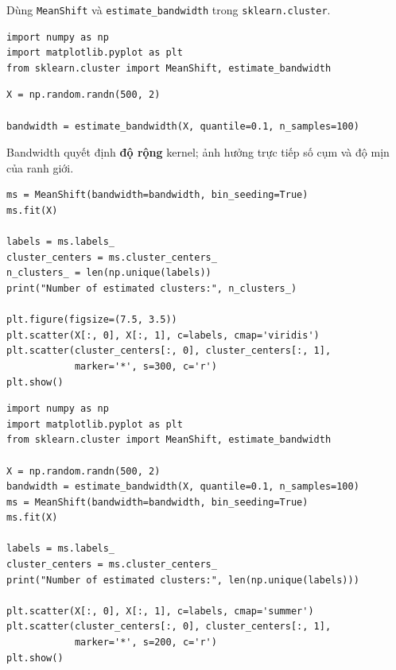 \begin{phuongphap}[title={scikit-learn}]
Dùng \texttt{MeanShift} và \texttt{estimate\_bandwidth} trong \texttt{sklearn.cluster}.
\end{phuongphap}

\begin{vidu}[title={Import}]
\begin{lstlisting}
import numpy as np
import matplotlib.pyplot as plt
from sklearn.cluster import MeanShift, estimate_bandwidth
\end{lstlisting}
\end{vidu}

\begin{vidu}[title={Sinh dữ liệu và ước lượng bandwidth}]
\begin{lstlisting}
X = np.random.randn(500, 2)

bandwidth = estimate_bandwidth(X, quantile=0.1, n_samples=100)
\end{lstlisting}
\end{vidu}

\begin{ynghia}[title={Bandwidth}]
Bandwidth quyết định \textbf{độ rộng} kernel; ảnh hưởng trực tiếp số cụm và độ mịn của ranh giới.
\end{ynghia}

\begin{vidu}[title={Khởi tạo, huấn luyện, trực quan}]
\begin{lstlisting}
ms = MeanShift(bandwidth=bandwidth, bin_seeding=True)
ms.fit(X)

labels = ms.labels_
cluster_centers = ms.cluster_centers_
n_clusters_ = len(np.unique(labels))
print("Number of estimated clusters:", n_clusters_)

plt.figure(figsize=(7.5, 3.5))
plt.scatter(X[:, 0], X[:, 1], c=labels, cmap='viridis')
plt.scatter(cluster_centers[:, 0], cluster_centers[:, 1],
            marker='*', s=300, c='r')
plt.show()
\end{lstlisting}
\end{vidu}

\begin{vidu}[title={Ví dụ đầy đủ (dữ liệu Gaussian 2D)}]
\begin{lstlisting}
import numpy as np
import matplotlib.pyplot as plt
from sklearn.cluster import MeanShift, estimate_bandwidth

X = np.random.randn(500, 2)
bandwidth = estimate_bandwidth(X, quantile=0.1, n_samples=100)
ms = MeanShift(bandwidth=bandwidth, bin_seeding=True)
ms.fit(X)

labels = ms.labels_
cluster_centers = ms.cluster_centers_
print("Number of estimated clusters:", len(np.unique(labels)))

plt.scatter(X[:, 0], X[:, 1], c=labels, cmap='summer')
plt.scatter(cluster_centers[:, 0], cluster_centers[:, 1],
            marker='*', s=200, c='r')
plt.show()
\end{lstlisting}
\end{vidu}

